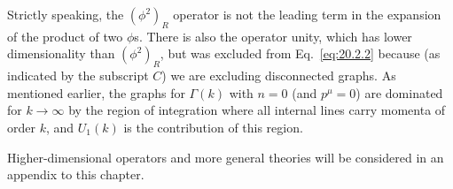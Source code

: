 Strictly speaking, the $(\phi^2)_R$ operator is not the leading term in the
expansion of the product of two $\phi$s. There is also the operator unity,
which has lower dimensionality than $(\phi^2)_R$, but was excluded from
Eq.~\eqref{eq:20.2.2} because (as indicated by the subscript $C$) we are
excluding disconnected graphs. As mentioned earlier, the graphs for
$\Gamma(k)$ with $n=0$ (and $p^\mu=0$) are dominated for $k\to\infty$ by
the region of integration where all internal lines carry momenta of order
$k$, and $U_1(k)$ is the contribution of this region.

Higher-dimensional operators and more general theories will be considered in
an appendix to this chapter.
